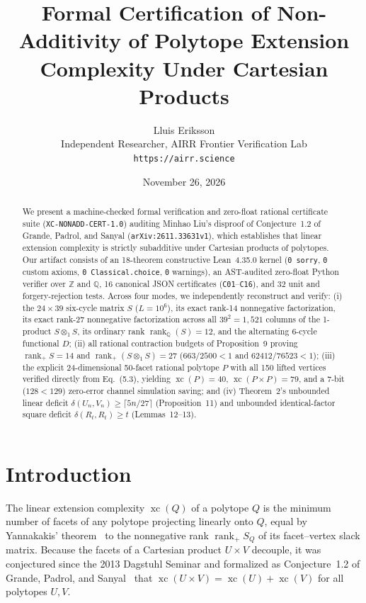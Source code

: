 \documentclass[10pt,twocolumn]{article}
\title{\textbf{Formal Certification of Non-Additivity of Polytope Extension Complexity Under Cartesian Products}}
\author{Lluis Eriksson\\
\small Independent Researcher, AIRR Frontier Verification Lab\\
\small \texttt{https://airr.science}}
\date{November 26, 2026}
\begin{document}
\maketitle

\begin{abstract}
We present a machine-checked formal verification and zero-float rational certificate suite (\texttt{XC-NONADD-CERT-1.0}) auditing Minhao Liu's disproof of Conjecture~1.2 of Grande, Padrol, and Sanyal (\texttt{arXiv:2611.33631v1}), which establishes that linear extension complexity is strictly subadditive under Cartesian products of polytopes. Our artifact consists of an 18-theorem constructive Lean~4.35.0 kernel (\texttt{0 sorry}, \texttt{0} custom axioms, \texttt{0 Classical.choice}, \texttt{0} warnings), an AST-audited zero-float Python verifier over $\mathbb{Z}$ and $\mathbb{Q}$, 16 canonical JSON certificates (\texttt{C01}--\texttt{C16}), and 32 unit and forgery-rejection tests. Across four modes, we independently reconstruct and verify: (i) the $24\times 39$ six-cycle matrix $S$ ($L=10^6$), its exact rank-14 nonnegative factorization, its exact rank-27 nonnegative factorization across all $39^2 = 1{,}521$ columns of the 1-product $S \otimes_1 S$, its ordinary rank $\operatorname{rank}_{\mathbb{Q}}(S)=12$, and the alternating 6-cycle functional $D$; (ii) all rational contraction budgets of Proposition~9 proving $\operatorname{rank}_+ S = 14$ and $\operatorname{rank}_+(S \otimes_1 S) = 27$ ($663/2500 < 1$ and $62412/76523 < 1$); (iii) the explicit 24-dimensional 50-facet rational polytope $P$ with all 150 lifted vertices verified directly from Eq.~(5.3), yielding $\operatorname{xc}(P)=40$, $\operatorname{xc}(P\times P)=79$, and a 7-bit ($128 < 129$) zero-error channel simulation saving; and (iv) Theorem~2's unbounded linear deficit $\delta(U_n, V_n) \geq \lceil 5n/27 \rceil$ (Proposition~11) and unbounded identical-factor square deficit $\delta(R_t, R_t) \geq t$ (Lemmas~12--13).
\end{abstract}

\section{Introduction}
The linear extension complexity $\operatorname{xc}(Q)$ of a polytope $Q$ is the minimum number of facets of any polytope projecting linearly onto $Q$, equal by Yannakakis' theorem~\cite{Yannakakis1991} to the nonnegative rank $\operatorname{rank}_+ S_Q$ of its facet--vertex slack matrix. Because the facets of a Cartesian product $U \times V$ decouple, it was conjectured since the 2013 Dagstuhl Seminar and formalized as Conjecture~1.2 of Grande, Padrol, and Sanyal~\cite{GPS2018} that $\operatorname{xc}(U \times V) = \operatorname{xc}(U) + \operatorname{xc}(V)$ for all polytopes $U, V$.
\end{document}
